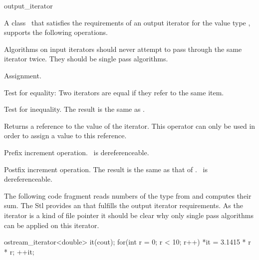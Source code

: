 \begin{ccClass}{output_iterator}



\ccDefinition

A class \ccClassName\ that satisfies the requirements of an output iterator
for the value type , supports the following operations.

Algorithms on input iterators should never attempt to pass through the
same iterator twice. They should be single pass algorithms.

\ccCreation
{}

{}

{}

\ccOperations

{Assignment.}

{Test for equality: Two iterators are equal if they refer to the same item.}

{Test for inequality. The result is the same as .}

{Returns a reference to the value of the iterator. This operator can
only be used in order to assign a value to this reference.}

{Prefix increment operation.
\ccPrecond \ccVar\ is dereferenceable.}

{Postfix increment operation. The result is the same as that of 
 .
\ccPrecond \ccVar\ is dereferenceable.}


\ccExample

The following code fragment reads numbers of the type 
from  and computes their sum. The {\sc Stl} provides an
 that fulfills the output iterator requirements.
As the iterator is a kind of file pointer it should be clear
why only single pass algorithms can be applied on this iterator.

\begin{cprog}
{
    ostream_iterator<double> it(cout);
    for(int r = 0; r < 10; r++){
        *it = 3.1415 * r * r;
        ++it;
    }
}
\end{cprog} 


\end{ccClass}
